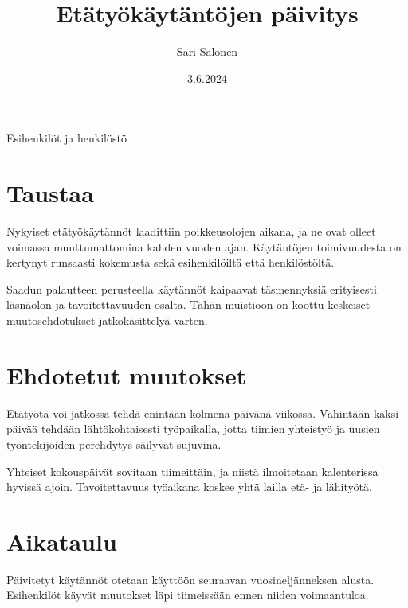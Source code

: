 \documentclass[nogap]{sfs-2487-2024}
\date{3.6.2024}
\author{Sari Salonen}
\title{Etätyökäytäntöjen päivitys}
\begin{document}
\maketitle


Esihenkilöt ja henkilöstö

\section{Taustaa}

Nykyiset etätyökäytännöt laadittiin poikkeusolojen aikana, ja ne ovat
olleet voimassa muuttumattomina kahden vuoden ajan. Käytäntöjen
toimivuudesta on kertynyt runsaasti kokemusta sekä esihenkilöiltä että
henkilöstöltä.

Saadun palautteen perusteella käytännöt kaipaavat täsmennyksiä erityisesti
läsnäolon ja tavoitettavuuden osalta. Tähän muistioon on koottu keskeiset
muutosehdotukset jatkokäsittelyä varten.

\section{Ehdotetut muutokset}

Etätyötä voi jatkossa tehdä enintään kolmena päivänä viikossa. Vähintään
kaksi päivää tehdään lähtökohtaisesti työpaikalla, jotta tiimien yhteistyö
ja uusien työntekijöiden perehdytys säilyvät sujuvina.

Yhteiset kokouspäivät sovitaan tiimeittäin, ja niistä ilmoitetaan
kalenterissa hyvissä ajoin. Tavoitettavuus työaikana koskee yhtä lailla
etä- ja lähityötä.

\section{Aikataulu}

Päivitetyt käytännöt otetaan käyttöön seuraavan vuosineljänneksen alusta.
Esihenkilöt käyvät muutokset läpi tiimeissään ennen niiden voimaantuloa.


\makecontactinfo
\end{document}
